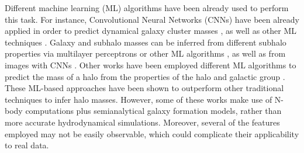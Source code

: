 \documentclass[twocolumn]{aastex631}
\begin{document}
Different machine learning (ML) algorithms have been already used to perform this task. For instance, Convolutional Neural Networks (CNNs) have been already applied in order to predict dynamical galaxy cluster masses \citep{Ntampaka:2018rjt, Ho:2019zap, Ramanah:2020ift, Ramanah:2020ylz,2020MNRAS.499.3445Y,2020ApJ...900..110G,deAndres:2021tjl}, as well as other ML techniques \citep{Ntampaka:2014ypa, Ntampaka:2015tba, Green:2019uup, 2019MNRAS.484.1526A, 2019arXiv191205316H}. Galaxy and subhalo masses can be inferred from different subhalo properties via multilayer perceptrons \citep{Shao:2021qoa} or other ML algorithms \citep{2021arXiv211101185V}, as well as from images with CNNs \citep{2021arXiv211108725D}. Other works have been employed different ML algorithms to predict the mass of a halo from the properties of the halo and galactic group \citep{2019ApJ...881...74M, 2019MNRAS.490.2367C, 2020arXiv201110577L}. These ML-based approaches have been shown to outperform other traditional techniques to infer halo masses. However, some of these works make use of N-body computations plus semianalytical galaxy formation models, rather than more accurate hydrodynamical simulations. Moreover, several of the features employed may not be easily observable, which could complicate their applicability to real data.
\end{document}
